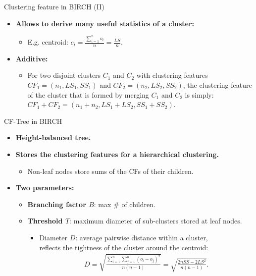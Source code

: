 \documentclass[aspectratio=169,t,xcolor=dvipsnames]{beamer}
\begin{document}
  { %
    \begin{frame}{Clustering feature in BIRCH (II)}
      \begin{itemize}
        \item \textbf{Allows to derive many useful statistics of a cluster:}
        \begin{itemize}
          \item E.g. centroid: $c_i = \frac{\sum_{i=1}^{n}o_i}{n} = \frac{LS}{n}$.
        \end{itemize}
        \item \textbf{Additive:}
        \begin{itemize}
          \item For two disjoint clusters $C_1$ and $C_2$ with clustering features $CF_1 = (n_1, LS_1, SS_1)$ and $CF_2 = (n_2, LS_2, SS_2)$, the clustering feature of the cluster that is formed by merging $C_1$ and $C_2$ is simply: $CF_1 + CF_2 = (n_1 + n_2, LS_1 + LS_2, SS_1 + SS_2)$.
        \end{itemize}
      \end{itemize}
    \end{frame}
  }

  { %
    \begin{frame}{CF-Tree in BIRCH}
      \begin{itemize}
        \item \textbf{Height-balanced tree.}
        \item \textbf{Stores the clustering features for a hierarchical clustering.}
        \begin{itemize}
          \item Non-leaf nodes store sums of the CFs of their children.
        \end{itemize}
        \item \textbf{Two parameters:}
        \begin{itemize}
          \item \textbf{\color{airforceblue}Branching factor $B$}: max \# of children.
          \item \textbf{\color{airforceblue}Threshold $T$}: maximum diameter of sub-clusters stored at leaf nodes.
          \begin{itemize}
            \item Diameter $D$: average pairwise distance within a cluster, \\
            reflects the tightness of the cluster around the centroid:
            \begin{align}
              D = \sqrt{\frac{\sum_{i=1}^{n} \sum_{j=1}^{n} (o_i-o_j)^2}{n(n-1)}} = \sqrt{\frac{2nSS - 2LS^2}{n(n-1)}}.
            \end{align}
          \end{itemize}
        \end{itemize}
      \end{itemize}
    \end{frame}
  }
\end{document}
